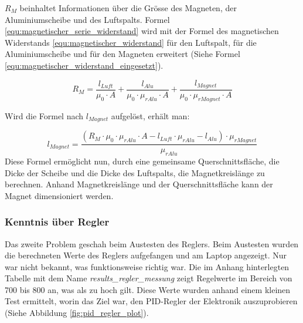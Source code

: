 $R_{M}$ beinhaltet Informationen über die Grösse des Magneten, der Aluminiumscheibe und des Luftspalts. Formel \ref{equ:magnetischer_serie_widerstand} wird mit der Formel des magnetischen Widerstands \ref{equ:magnetischer_widerstand} für den Luftspalt, für  die Aluminiumscheibe und für den Magneten erweitert (Siehe Formel \ref{equ:magnetischer_widerstand_eingesetzt}).

\begin{equation}
  \label{equ:magnetischer_widerstand_eingesetzt}
R_{M}=\frac{l_{Luft}}{\mu_{0}\cdot A}+\frac{l_{Alu}}{\mu_{0}\cdot \mu_{rAlu}\cdot A}+\frac{l_{Magnet}}{\mu_{0}\cdot \mu_{rMagnet}\cdot A} \tag{31}
\end{equation}
\newpara

Wird die Formel nach $l_{Magnet}$ aufgelöst, erhält man:

\begin{equation}
  l_{Magnet}=\frac{(R_{M}\cdot\mu_{0}\cdot\mu_{rAlu}\cdot A - l_{Luft}\cdot\mu_{rAlu}-l_{Alu})\cdot\mu_{rMagnet}}{\mu_{rAlu}} \tag{32}
\end{equation}
\newpara
Diese Formel ermöglicht nun, durch eine gemeinsame Querschnittsfläche, die Dicke der Scheibe und die Dicke des Luftspalts, die Magnetkreislänge zu berechnen. Anhand Magnetkreislänge und der Querschnittsfläche kann der Magnet dimensioniert werden.
\newpage
\subsubsection{Kenntnis über Regler}
Das zweite Problem geschah beim Austesten des Reglers. Beim Austesten wurden die berechneten Werte des Reglers aufgefangen und am Laptop angezeigt. Nur war nicht bekannt, was funktionsweise richtig war. Die im Anhang hinterlegten Tabelle mit dem Name \textit{results\_regler\_messung} zeigt Regelwerte im Bereich von 700 bis 800 an, was als zu hoch gilt. Diese Werte wurden anhand einem kleinen Test ermittelt, worin das Ziel war, den PID-Regler der Elektronik auszuprobieren (Siehe Abbildung \ref{fig:pid_regler_plot}).

